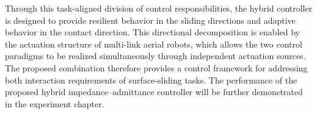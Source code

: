 Through this task-aligned division of control responsibilities, the hybrid controller is designed to provide resilient behavior in the sliding directions and adaptive behavior in the contact direction. This directional decomposition is enabled by the actuation structure of multi-link aerial robots, which allows the two control paradigms to be realized simultaneously through independent actuation sources. The proposed combination therefore provides a control framework for addressing both interaction requirements of surface-sliding tasks. The performance of the proposed hybrid impedance--admittance controller will be further demonstrated in the experiment chapter.







